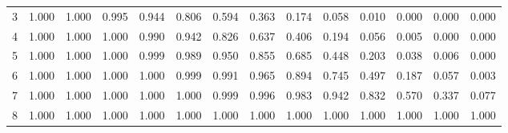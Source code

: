 \documentclass[
]{article}
\begin{document}
\begin{longtable}[t]{lrrrrrrrrrrrrr}
\hspace{1em}3 & 1.000 & 1.000 & 0.995 & 0.944 & 0.806 & 0.594 & 0.363 & 0.174 & 0.058 & 0.010 & 0.000 & 0.000 & 0.000\\
\hspace{1em}4 & 1.000 & 1.000 & 1.000 & 0.990 & 0.942 & 0.826 & 0.637 & 0.406 & 0.194 & 0.056 & 0.005 & 0.000 & 0.000\\
\hspace{1em}5 & 1.000 & 1.000 & 1.000 & 0.999 & 0.989 & 0.950 & 0.855 & 0.685 & 0.448 & 0.203 & 0.038 & 0.006 & 0.000\\
\hspace{1em}6 & 1.000 & 1.000 & 1.000 & 1.000 & 0.999 & 0.991 & 0.965 & 0.894 & 0.745 & 0.497 & 0.187 & 0.057 & 0.003\\
\hspace{1em}7 & 1.000 & 1.000 & 1.000 & 1.000 & 1.000 & 0.999 & 0.996 & 0.983 & 0.942 & 0.832 & 0.570 & 0.337 & 0.077\\
\hspace{1em}8 & 1.000 & 1.000 & 1.000 & 1.000 & 1.000 & 1.000 & 1.000 & 1.000 & 1.000 & 1.000 & 1.000 & 1.000 & 1.000\\
\bottomrule
\end{longtable}
\end{document}
